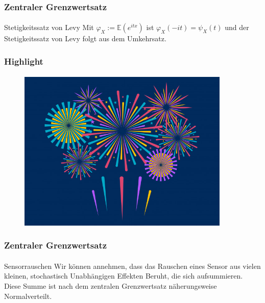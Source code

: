 \documentclass{beamer}
\begin{document}
\begin{frame}
    \frametitle{Zentraler Grenzwertsatz}
\framesubtitle{}

\begin{block}{Stetigkeitssatz von Levy}
Mit $\varphi_{X} := \mathbb{E}(e^{i tx})$  ist $\varphi _{X}(-it)=\psi_{X}(t)$ und der Stetigkeitssatz von Levy folgt aus dem Umkehrsatz.
\end{block}
 \end{frame}



\begin{frame}
    \frametitle{Highlight}
\framesubtitle{}
\begin{figure}[htp]
      \centering
    \includegraphics[width=0.9\textwidth]{img/firework}
\end{figure}
 \end{frame}


\begin{frame}
    \frametitle{Zentraler Grenzwertsatz}
\framesubtitle{}


\begin{block}{Sensorrauschen}
Wir können annehmen, dass das Rauschen eines Sensor aus vielen kleinen, stochastisch Unabhängigen Effekten Beruht, die sich aufsummieren.  Diese Summe ist nach dem zentralen Grenzwertsatz näherungsweise Normalverteilt.
\end{block}

 \end{frame}
\end{document}
